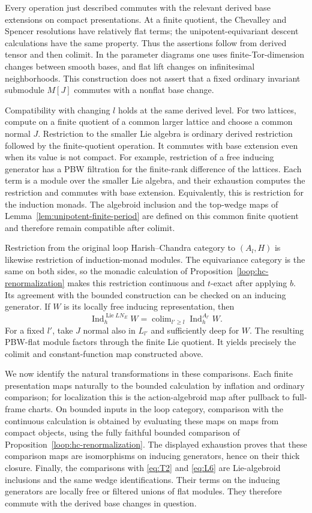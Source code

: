 Every operation just described commutes with the relevant derived
base extensions on compact presentations.  At a finite quotient,
the Chevalley and Spencer resolutions have relatively flat terms;
the unipotent-equivariant descent calculations have the same property.
Thus the assertions follow from derived tensor and then colimit.
In the parameter diagrams one uses finite-Tor-dimension changes
between smooth bases, and flat lift changes on infinitesimal
neighborhoods.  This construction does not assert that a fixed
ordinary invariant submodule $M[J]$ commutes with a nonflat base
change.

Compatibility with changing $l$ holds at the same derived level.
For two lattices, compute on a finite quotient of a common larger
lattice and choose a common normal $J$.  Restriction to the smaller
Lie algebra is ordinary derived restriction followed by the
finite-quotient operation.  It commutes with base extension even
when its value is not compact.  For example, restriction of a free
inducing generator has a PBW filtration for the finite-rank difference
of the lattices.  Each term is a module over the smaller Lie algebra,
and their exhaustion computes the restriction and commutes with
base extension.  Equivalently, this is restriction for the induction
monads.  The algebroid inclusion and the top-wedge maps of
Lemma~\ref{lem:unipotent-finite-period} are defined on this common
finite quotient and therefore remain compatible after colimit.

Restriction from the original loop Harish--Chandra category to
$(A_l,H)$ is likewise restriction of induction-monad modules.  The
equivariance category is the same on both sides, so the monadic
calculation of Proposition~\ref{loop:hc-renormalization} makes this
restriction continuous and $t$-exact after applying $b$.  Its agreement with the bounded construction can be checked
on an inducing generator.  If $W$ is its locally free inducing
representation, then
\[
 \operatorname{Ind}_{h}^{\operatorname{Lie}LN_E}W
   =\mathop{\operatorname{colim}}_{l'\geq l}
                         \operatorname{Ind}_{h}^{A_{l'}}W.
\]
For a fixed $l'$, take $J$ normal also in $L_{l'}$ and sufficiently
deep for $W$.  The resulting PBW-flat module factors through the
finite Lie quotient.  It yields precisely the colimit and
constant-function map constructed above.

We now identify the natural transformations in these comparisons.
Each finite presentation maps naturally to the bounded
calculation by inflation and ordinary comparison; for localization
this is the action-algebroid map after pullback to full-frame charts.
On bounded inputs in the loop category, comparison with the
continuous calculation is obtained by evaluating these maps on
maps from compact objects, using the fully faithful bounded
comparison of
Proposition~\ref{loop:hc-renormalization}.  The displayed exhaustion proves that
these comparison maps are isomorphisms on inducing generators,
hence on their thick closure.  Finally, the comparisons with
\eqref{eq:T2} and \eqref{eq:L6} are Lie-algebroid inclusions and
the same wedge identifications.  Their terms on the inducing
generators are locally free or filtered unions of flat modules.
They therefore commute with the derived base changes in question.


